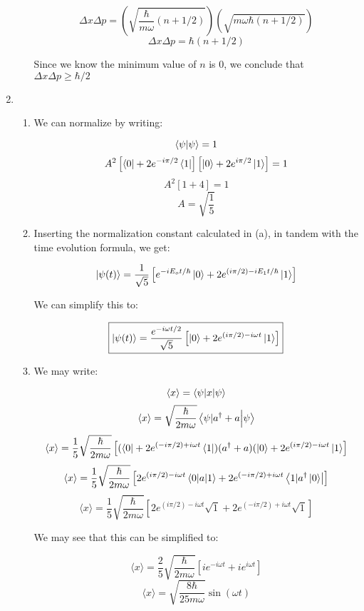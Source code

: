 \begin{enumerate}
\begin{enumerate}
        $$\Delta x\Delta p=\left( \sqrt{\frac{\hbar}{m\omega}(n+1/2)} \right)\left( \sqrt{m\omega\hbar(n+1/2)} \right)$$
        $$\boxed{\Delta x\Delta p=\hbar(n+1/2)}$$

        Since we know the minimum value of $n$ is 0, we conclude that $\boxed{\Delta x\Delta p\geq \hbar/2}$

    \end{enumerate}

  \item

    \begin{enumerate}

      \item We can normalize by writing:

        $$\braket{\psi}=1$$
        $$A^2\left[ \bra{0}+2e^{-i\pi/2}\bra{1} \right]\left[ \ket{0}+2e^{i\pi/2}\ket{1} \right]=1$$
        $$A^2\left[ 1+4 \right]=1$$
        $$\boxed{A=\sqrt{\frac{1}{5}}}$$

      \item Inserting the normalization constant calculated in (a), in tandem with the time evolution formula, we get:

        $$\ket{\psi(t)}=\frac{1}{\sqrt{5}}\left[ e^{-iE_ot/\hbar}\ket{0}+2e^{(i\pi/2)-iE_1t/\hbar}\ket{1} \right]$$

        We can simplify this to:

        $$\boxed{\ket{\psi(t)}=\frac{e^{-i\omega t/2}}{\sqrt{5}}\left[ \ket{0}+2e^{(i\pi/2)-i\omega t}\ket{1} \right]}$$


      \item We may write:

        $$\langle x\rangle=\bra{\psi|x}\ket{\psi}$$
        $$\langle x\rangle=\sqrt{\frac{\hbar}{2m\omega}}\bra{\psi|a^{\dagger} + a}\ket{\psi}$$
        $$\langle x\rangle=\frac{1}{5}\sqrt{\frac{\hbar}{2m\omega}}\left[(\bra{0}+2e^{(-i\pi/2)+i\omega t}\bra{1})(a^{\dagger}+a)(\ket{0}+2e^{(i\pi/2)-i\omega t}\ket{1}\right]$$
          $$\langle x\rangle=\frac{1}{5}\sqrt{\frac{\hbar}{2m\omega}}\left[2e^{(i\pi/2)-i\omega t}\bra{0|a}\ket{1}+2e^{(-i\pi/2)+i\omega t}\bra{1|a^{\dagger}\ket{0}}\right]$$
          $$\langle x\rangle=\frac{1}{5}\sqrt{\frac{\hbar}{2m\omega}}\left[2e^{(i\pi/2)-i\omega t}\sqrt{1}+2e^{(-i\pi/2)+i\omega t}\sqrt{1}\right]$$

          We may see that this can be simplified to:

          $$\langle x\rangle=\frac{2}{5}\sqrt{\frac{\hbar}{2m\omega}}\left[ie^{-i\omega t}+ie^{i\omega t}\right]$$
          $$\boxed{\langle x\rangle=\sqrt{\frac{8\hbar}{25m\omega}}\sin(\omega t)}$$


\end{enumerate}
\end{enumerate}
